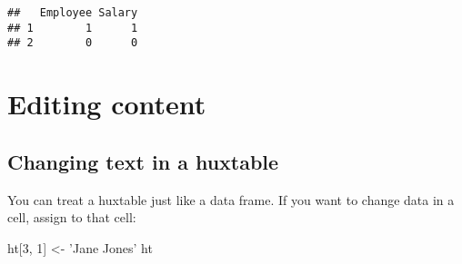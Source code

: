 \documentclass[]{article}
\newenvironment{Shaded}{\begin{snugshade}}{\end{snugshade}}
\newcommand{\DecValTok}[1]{\textcolor[rgb]{0.00,0.00,0.81}{#1}}
\newcommand{\StringTok}[1]{\textcolor[rgb]{0.31,0.60,0.02}{#1}}
\newcommand{\NormalTok}[1]{#1}
\begin{document}
\begin{verbatim}
##   Employee Salary
## 1        1      1
## 2        0      0
\end{verbatim}

\FloatBarrier

\section{Editing content}\label{editing-content}

\subsection{Changing text in a
huxtable}\label{changing-text-in-a-huxtable}

You can treat a huxtable just like a data frame. If you want to change
data in a cell, assign to that cell:

\begin{Shaded}
\begin{Highlighting}[]
\NormalTok{ht[}\DecValTok{3}\NormalTok{, }\DecValTok{1}\NormalTok{] <-}\StringTok{ 'Jane Jones'}
\NormalTok{ht}
\end{Highlighting}
\end{Shaded}
\end{document}

